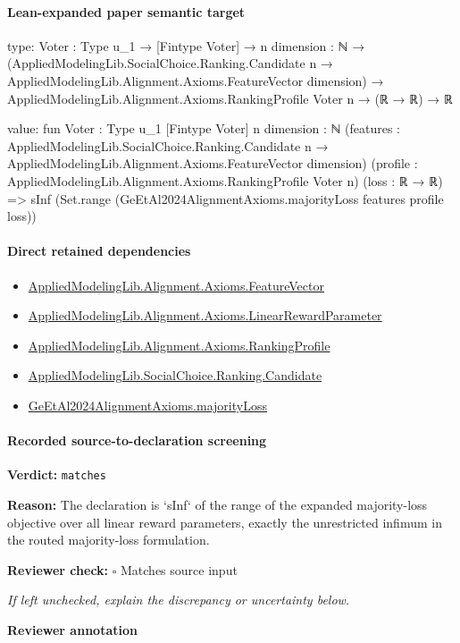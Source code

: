 \documentclass[10pt]{article}
\newcommand{\reviewerbox}{%
  \par\noindent\fbox{\parbox{0.96\linewidth}{\rule{0pt}{0.38in}}}\par
}
\newcommand{\reviewmatch}[1]{%
  \par\noindent\textbf{Reviewer check:} $\square$\; #1\par
  \noindent\emph{If left unchecked, explain the discrepancy or uncertainty below.}\par
}
\begin{document}
\paragraph{Lean-expanded paper semantic target}
\begin{ReviewVerbatim}
type:
{Voter : Type u_1} →
  [Fintype Voter] →
    {n dimension : ℕ} →
      (AppliedModelingLib.SocialChoice.Ranking.Candidate n →
          AppliedModelingLib.Alignment.Axioms.FeatureVector dimension) →
        AppliedModelingLib.Alignment.Axioms.RankingProfile Voter n → (ℝ → ℝ) → ℝ

value:
fun {Voter : Type u_1} [Fintype Voter] {n dimension : ℕ}
    (features :
      AppliedModelingLib.SocialChoice.Ranking.Candidate n → AppliedModelingLib.Alignment.Axioms.FeatureVector dimension)
    (profile : AppliedModelingLib.Alignment.Axioms.RankingProfile Voter n) (loss : ℝ → ℝ) =>
  sInf (Set.range (GeEtAl2024AlignmentAxioms.majorityLoss features profile loss))
\end{ReviewVerbatim}

\paragraph{Direct retained dependencies}
\begin{itemize}\raggedright
\item \hyperlink{library-prerequisite-a0b67c6a143b0b13}{Applied\allowbreak{}Modeling\allowbreak{}Lib.\allowbreak{}Alignment.\allowbreak{}Axioms.\allowbreak{}Feature\allowbreak{}Vector}
\item \hyperlink{library-prerequisite-d58203ca3f4a8c05}{Applied\allowbreak{}Modeling\allowbreak{}Lib.\allowbreak{}Alignment.\allowbreak{}Axioms.\allowbreak{}Linear\allowbreak{}Reward\allowbreak{}Parameter}
\item \hyperlink{library-prerequisite-9bded048a60dfe0a}{Applied\allowbreak{}Modeling\allowbreak{}Lib.\allowbreak{}Alignment.\allowbreak{}Axioms.\allowbreak{}Ranking\allowbreak{}Profile}
\item \hyperlink{library-prerequisite-8c0e6c25845ae78a}{Applied\allowbreak{}Modeling\allowbreak{}Lib.\allowbreak{}Social\allowbreak{}Choice.\allowbreak{}Ranking.\allowbreak{}Candidate}
\item \hyperlink{paper-prerequisite-8892d6fc4aee77f3}{Ge\allowbreak{}Et\allowbreak{}Al2024\allowbreak{}Alignment\allowbreak{}Axioms.\allowbreak{}majority\allowbreak{}Loss}
\end{itemize}
\paragraph{Recorded source-to-declaration screening}
\textbf{Verdict:} \texttt{matches}
\\
{\raggedright
\textbf{Reason:} The declaration is `sInf` of the range of the expanded majority-\allowbreak{}loss objective over all linear reward parameters, exactly the unrestricted infimum in the routed majority-\allowbreak{}loss formulation.\allowbreak{}
\par}
\reviewmatch{Matches source input}
\noindent\textbf{Reviewer annotation}\par
\reviewerbox
\clearpage
\hypertarget{paper-prerequisite-465cdc3ee9c9c6a0}{}
\end{document}
